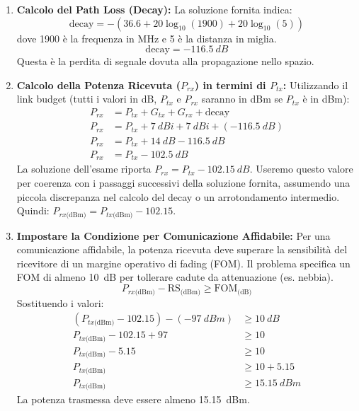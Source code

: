 \begin{enumerate}[label=\textbf{Step \arabic*:}, wide, labelwidth=!, labelindent=0pt]
    \item \textbf{Calcolo del Path Loss (Decay):}
    La soluzione fornita indica:
    \begin{equation}
        \text{decay} = - (36.6 + 20\log_{10}(1900) + 20\log_{10}(5))
    \end{equation}
    dove 1900 è la frequenza in MHz e 5 è la distanza in miglia.
    \begin{equation}
        \text{decay} = \SI{-116.5}{dB}
    \end{equation}
    Questa è la perdita di segnale dovuta alla propagazione nello spazio.

    \item \textbf{Calcolo della Potenza Ricevuta ($P_{rx}$) in termini di $P_{tx}$:}
    Utilizzando il link budget (tutti i valori in dB, $P_{tx}$ e $P_{rx}$ saranno in dBm se $P_{tx}$ è in dBm):
    \begin{align}
        P_{rx} &= P_{tx} + G_{tx} + G_{rx} + \text{decay} \\
        P_{rx} &= P_{tx} + \SI{7}{dBi} + \SI{7}{dBi} + (\SI{-116.5}{dB}) \\
        P_{rx} &= P_{tx} + \SI{14}{dB} - \SI{116.5}{dB} \\
        P_{rx} &= P_{tx} - \SI{102.5}{dB}
    \end{align}
    La soluzione dell'esame riporta $P_{rx} = P_{tx} - \SI{102.15}{dB}$. Useremo questo valore per coerenza con i passaggi successivi della soluzione fornita, assumendo una piccola discrepanza nel calcolo del decay o un arrotondamento intermedio.
    Quindi: $P_{rx\text{(dBm)}} = P_{tx\text{(dBm)}} - 102.15$.

    \item \textbf{Impostare la Condizione per Comunicazione Affidabile:}
    Per una comunicazione affidabile, la potenza ricevuta deve superare la sensibilità del ricevitore di un margine operativo di fading (FOM). Il problema specifica un FOM di almeno \SI{10}{dB} per tollerare cadute da attenuazione (es. nebbia).
    \begin{equation}
        P_{rx\text{(dBm)}} - \text{RS}_{\text{(dBm)}} \geq \text{FOM}_{\text{(dB)}}
    \end{equation}
    Sostituendo i valori:
    \begin{align}
        (P_{tx\text{(dBm)}} - 102.15) - (\SI{-97}{dBm}) &\geq \SI{10}{dB} \\
        P_{tx\text{(dBm)}} - 102.15 + 97 &\geq 10 \\
        P_{tx\text{(dBm)}} - 5.15 &\geq 10 \\
        P_{tx\text{(dBm)}} &\geq 10 + 5.15 \\
        P_{tx\text{(dBm)}} &\geq \SI{15.15}{dBm}
    \end{align}
    La potenza trasmessa deve essere almeno \SI{15.15}{dBm}.


\end{enumerate}
